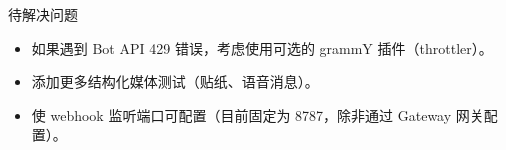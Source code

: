 待解决问题

\begin{itemize}
  \item 如果遇到 Bot API 429 错误，考虑使用可选的 grammY 插件（throttler）。
  \item 添加更多结构化媒体测试（贴纸、语音消息）。
  \item 使 webhook 监听端口可配置（目前固定为 8787，除非通过 Gateway 网关配置）。
\end{itemize}



\clearpage


